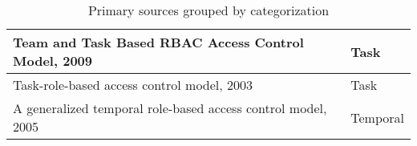 \begin{table}
\begin{tabular}{|p{12.5cm}|p{3cm}|}
Team and Task Based RBAC Access Control Model, 2009 \cite{zhou2007team} & Task \\\hline

Task-role-based access control model, 2003 \cite{oh2003task} & Task \\\hline

A generalized temporal role-based access control model, 2005 \cite{joshi05:generalized} & Temporal \\\hline

\end{tabular}
\caption{Primary sources grouped by categorization}
\label{tab:categorization}
\end{table}
